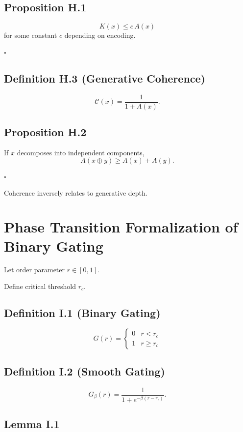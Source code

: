 \documentclass[12pt]{article}
\begin{document}
\subsection*{Proposition H.1}

\[
K(x) \le c\,A(x)
\]
for some constant $c$ depending on encoding.

\hfill $\square$

\subsection*{Definition H.3 (Generative Coherence)}

\[
\mathcal{C}(x)
=
\frac{1}{1 + A(x)}.
\]

\subsection*{Proposition H.2}

If $x$ decomposes into independent components,
\[
A(x \oplus y) \ge A(x) + A(y).
\]

\hfill $\square$

Coherence inversely relates to generative depth.

\section{Phase Transition Formalization of Binary Gating}

Let order parameter $r \in [0,1]$.

Define critical threshold $r_c$.

\subsection*{Definition I.1 (Binary Gating)}

\[
G(r)
=
\begin{cases}
0 & r < r_c \\
1 & r \ge r_c
\end{cases}
\]

\subsection*{Definition I.2 (Smooth Gating)}

\[
G_\beta(r)
=
\frac{1}{1 + e^{-\beta (r - r_c)}}.
\]

\subsection*{Lemma I.1}
\end{document}
